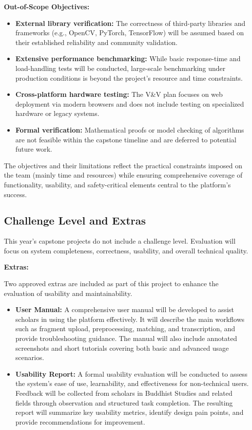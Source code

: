 \documentclass[12pt, titlepage]{article}
\begin{document}
\textbf{Out-of-Scope Objectives:}
\begin{itemize}
    \item \textbf{External library verification:} The correctness of third-party libraries and frameworks (e.g., OpenCV, PyTorch, TensorFlow) will be assumed based on their established reliability and community validation.
    \item \textbf{Extensive performance benchmarking:} While basic response-time and load-handling tests will be conducted, large-scale benchmarking under production conditions is beyond the project’s resource and time constraints.
    \item \textbf{Cross-platform hardware testing:} The V\&V plan focuses on web deployment via modern browsers and does not include testing on specialized hardware or legacy systems.
    \item \textbf{Formal verification:} Mathematical proofs or model checking of algorithms are not feasible within the capstone timeline and are deferred to potential future work.
\end{itemize}

The objectives and their limitations reflect the practical constraints imposed on the team (mainly time and resources) while ensuring comprehensive coverage of functionality, usability, and safety-critical elements central to the platform’s success.


\subsection{Challenge Level and Extras}

This year’s capstone projects do not include a challenge level. Evaluation will focus on system completeness, correctness, usability, and overall technical quality.

\textbf{Extras:}

Two approved extras are included as part of this project to enhance the evaluation of usability and maintainability.

\begin{itemize}
    \item \textbf{User Manual:}  
    A comprehensive user manual will be developed to assist scholars in using the platform effectively. It will describe the main workflows such as fragment upload, preprocessing, matching, and transcription, and provide troubleshooting guidance. The manual will also include annotated screenshots and short tutorials covering both basic and advanced usage scenarios.

    \item \textbf{Usability Report:}  
    A formal usability evaluation will be conducted to assess the system’s ease of use, learnability, and effectiveness for non-technical users. Feedback will be collected from scholars in Buddhist Studies and related fields through observation and structured task completion. The resulting report will summarize key usability metrics, identify design pain points, and provide recommendations for improvement.
\end{itemize}
\end{document}
